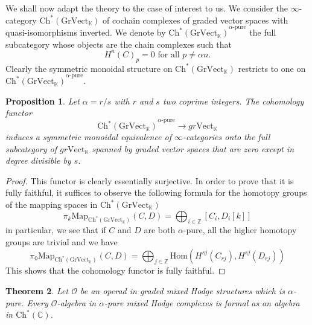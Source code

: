 \documentclass[a4paper]{amsart}
\newtheorem{theo}{Theorem}[section]
\newtheorem{prop}[theo]{Proposition}
\theoremstyle{definition}
\theoremstyle{theorem}
\newcommand{\CC}{\mathbb{C}}
\newcommand{\KK}{\mathbb{K}}
\newcommand{\Oo}{\mathcal{O}}
\newcommand{\ch}[1]{\mathrm{Ch^*({#1})}}
\newcommand{\Vect}{\mathrm{Vect}}
\newcommand{\Hom}{\mathrm{Hom}}
\begin{document}
We shall now adapt the theory to the case of interest to us. We consider the $\infty$-category $\ch{Gr\Vect_\KK}$ of cochain complexes of graded vector spaces with quasi-isomorphisms inverted. We denote by $\ch{Gr\Vect_\KK}^{\alpha\text{-pure}}$ the full subcategory whose objects are the chain complexes such that
\[H^n(C)_p=0 \text{ for all }p\neq \alpha n.\]
Clearly the symmetric monoidal structure on $\ch{Gr\Vect_\KK}$ restricts to one on $\ch{Gr\Vect_\KK}^{\alpha\text{-pure}}$.


\begin{prop}
Let $\alpha=r/s$ with $r$ and $s$ two coprime integers. The cohomology functor
\[\ch{Gr\Vect_\KK}^{\alpha\text{-pure}}\to gr\Vect_\KK\]
induces a symmetric monoidal equivalence of $\infty$-categories onto the full subcategory of $gr\Vect_\KK$ spanned by graded vector spaces that are zero except in degree divisible by $s$.
\end{prop}

\begin{proof}
This functor is clearly essentially surjective. In order to prove that it is fully faithful, it suffices to observe the following formula for the homotopy groups of the mapping spaces in $\ch{Gr\Vect_\KK}$
\[\pi_k\mathrm{Map}_{\ch{Gr\Vect_\KK}}(C,D)=\bigoplus_{i\in\mathbb{Z}}[C_i,D_i[k]]\]
in particular, we see that if $C$ and $D$ are both $\alpha$-pure, all the higher homotopy groups are trivial and we have 
\[\pi_0\mathrm{Map}_{\ch{Gr\Vect_\KK}}(C,D)=\bigoplus_{j\in\mathbb{Z}}\Hom(H^{sj}(C_{rj}),H^{sj}(D_{rj}))\]
This shows that the cohomology functor is fully faithful.
\end{proof}



\begin{theo}\label{purity_implies_formality}
Let $\Oo$ be an operad in graded mixed Hodge structures which is $\alpha$-pure. Every $\Oo$-algebra in $\alpha$-pure mixed Hodge complexes is formal as an algebra in $\ch{\CC}$.
\end{theo}
\end{document}
